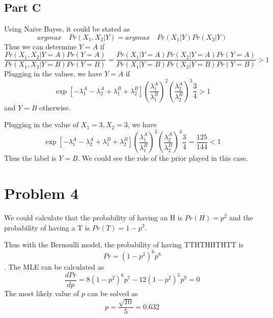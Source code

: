 \subsection{Part C}
Using Naive Bayes, it could be stated as 
\[argmax\quad Pr(X_1,X_2|Y)=argmax\quad Pr(X_1|Y)Pr(X_2|Y)\]
Thus we can determine $Y=A$ if
\[\dfrac{Pr(X_1,X_2|Y=A)Pr(Y=A)}{Pr(X_1,X_2|Y=B)Pr(Y=B)}=\dfrac{Pr(X_1|Y=A)Pr(X_2|Y=A)Pr(Y=A)}{Pr(X_1|Y=B)Pr(X_2|Y=B)Pr(Y=B)}>1\] Plugging in the values, we have $Y=A$ if \[\exp[-\lambda_1^A-\lambda_2^A+\lambda_1^B+\lambda_2^B](\dfrac{\lambda_1^A}{\lambda_1^B})^2(\dfrac{\lambda_2^A}{\lambda_2^B})^3\dfrac{3}{4}>1\] and $Y=B$ otherwise. 

Plugging in the value of $X_1=3,X_2=3$, we have \[\exp[-\lambda_1^A-\lambda_2^A+\lambda_1^B+\lambda_2^B](\dfrac{\lambda_1^A}{\lambda_1^B})^2(\dfrac{\lambda_2^A}{\lambda_2^B})^3\dfrac{3}{4}=\dfrac{125}{144}<1\] Thus the label is $Y=B$. We could see the role of the prior played in this case.



\section{Problem 4}
We could calculate that the probability of having an H is $Pr(H)=p^2$ and the probability of having a T is $ Pr(T)=1-p^2 $. 

Thus with the Bernoulli model, the probability of having TTHTHHTHTT is \[Pr=(1-p^2)^6p^8\]. The MLE can be calculated as \[\dfrac{dPr}{dp}=8(1-p^2)^6p^7-12(1-p^2)^5p^9=0\] The most likely value of $p$ can be solved as \[p=\dfrac{\sqrt{10}}{5}=0.632\]



